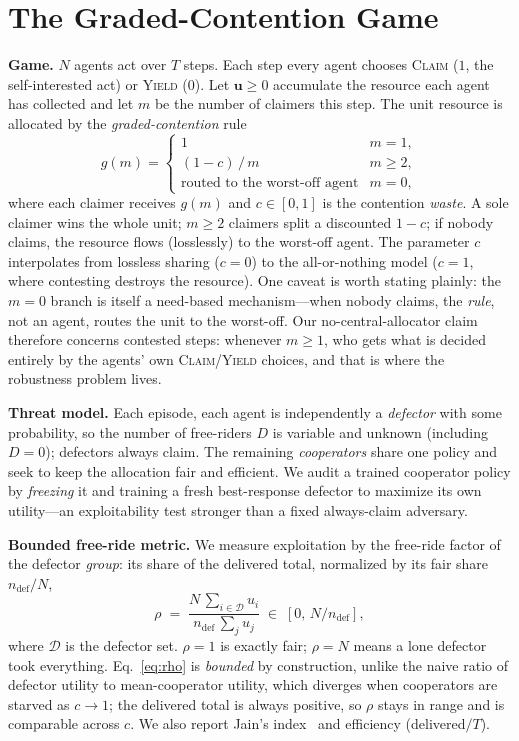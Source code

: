 \documentclass[conference, a4paper]{IEEEtran}
\begin{document}
\section{The Graded-Contention Game}
\textbf{Game.} $N$ agents act over $T$ steps. Each step every agent chooses
\textsc{Claim} ($1$, the self-interested act) or \textsc{Yield} ($0$). Let
$\mathbf{u}\ge 0$ accumulate the resource each agent has collected and let $m$ be
the number of claimers this step. The unit resource is allocated by the
\emph{graded-contention} rule
\begin{equation}
g(m)=\begin{cases}
1 & m=1,\\[2pt]
(1{-}c)\,/\,m & m\ge 2,\\[2pt]
\text{routed to the worst-off agent} & m=0,
\end{cases}
\end{equation}
where each claimer receives $g(m)$ and $c\in[0,1]$ is the contention
\emph{waste}. A sole claimer wins the whole unit; $m\ge 2$ claimers split a
discounted $1{-}c$; if nobody claims, the resource flows (losslessly) to the
worst-off agent. The parameter $c$ interpolates from lossless sharing ($c{=}0$) to
the all-or-nothing model ($c{=}1$, where contesting destroys the resource). One
caveat is worth stating plainly: the $m{=}0$ branch is itself a need-based
mechanism---when nobody claims, the \emph{rule}, not an agent, routes the unit to
the worst-off. Our no-central-allocator claim therefore concerns contested steps:
whenever $m\ge1$, who gets what is decided entirely by the agents' own
\textsc{Claim}/\textsc{Yield} choices, and that is where the robustness problem
lives.

\textbf{Threat model.} Each episode, each agent is independently a \emph{defector}
with some probability, so the number of free-riders $D$ is variable and unknown
(including $D{=}0$); defectors always claim. The remaining \emph{cooperators} share
one policy and seek to keep the allocation fair and efficient. We audit a trained
cooperator policy by \emph{freezing} it and training a fresh best-response defector
to maximize its own utility---an exploitability test stronger than a fixed
always-claim adversary.

\textbf{Bounded free-ride metric.} We measure exploitation by the free-ride factor
of the defector \emph{group}: its share of the delivered total, normalized by its
fair share $n_{\mathrm{def}}/N$,
\begin{equation}
\rho \;=\; \frac{N\,\sum_{i\in\mathcal{D}} u_i}
{\,n_{\mathrm{def}}\,\sum_{j} u_j\,}\;\in\;[0,\,N/n_{\mathrm{def}}],
\label{eq:rho}
\end{equation}
where $\mathcal D$ is the defector set. $\rho{=}1$ is exactly fair; $\rho{=}N$ means
a lone defector took everything. Eq.~\eqref{eq:rho} is \emph{bounded} by
construction, unlike the naive ratio of defector utility to mean-cooperator
utility, which diverges when cooperators are starved as $c\to1$; the delivered
total is always positive, so $\rho$ stays in range and is comparable across $c$. We
also report Jain's index~\cite{jain1984fairness} and efficiency
(delivered$/T$).
\end{document}
